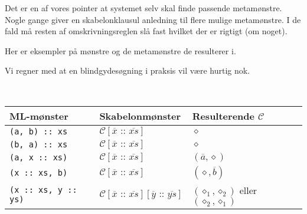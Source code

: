 


Det er en af vores pointer at systemet selv skal finde passende
metamønstre. Nogle gange giver en skabelonklausul anledning til flere
mulige metamønstre. I de fald må resten af omskrivningsreglen slå fast hvilket
der er rigtigt (om noget).

Her er eksempler på mønstre og de metamønstre de resulterer i.

Vi regner med at en blindgydesøgning i praksis vil være hurtig nok.

  \begin{example} \ 


    \begin{tabular}{l|l|l} 
      ML-mønster & Skabelonmønster & Resulterende
      $\mathcal{C}$ \\ \hline
      
      \texttt{(a, b) :: xs} & $\mathcal{C}[\overline{x} \texttt{ :: } \overline{xs}]$ &
      $\diamond$ \\

      \texttt{(b, a) :: xs} & $\mathcal{C}[\overline{x} \texttt{ :: } \overline{xs}]$ &
      $\diamond$ \\

      \texttt{(a, x :: xs)} & $\mathcal{C}[\overline{x} \texttt{ :: } \overline{xs}]$ &
      $(\overline{a}, \diamond)$ \\

      \texttt{(x :: xs, b)} & $\mathcal{C}[\overline{x} \texttt{ :: } \overline{xs}]$ &
      $(\diamond, \overline{b})$ \\

      \texttt{(x :: xs, y :: ys)} & $\mathcal{C}[\overline{x} \texttt{ :: }
      \overline{xs}][\overline{y} \texttt{ :: } \overline{ys}]$ &
      $(\diamond_1, \diamond_2)$ eller $(\diamond_2, \diamond_1)$\\
      
    \end{tabular}
    
  \end{example}


